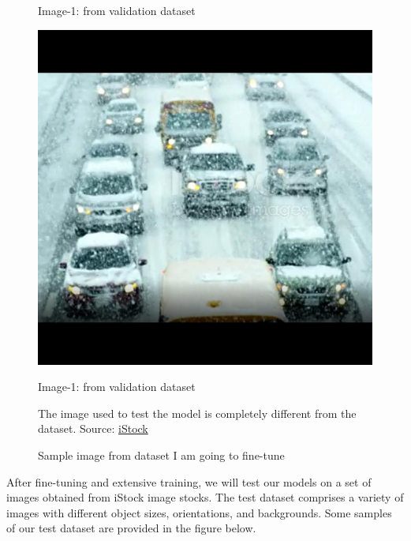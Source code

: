 \begin{figure}[H]
\begin{minipage}{0.5\textwidth}
    \caption{Image-1: from validation dataset}
    \label{fig:valid-1}
  \end{minipage}
    \begin{minipage}{0.5\textwidth}
    \centering
    \includegraphics[width=\linewidth]{tex/img/valid-2.jpg}
    \caption{Image-1: from validation dataset}
    \label{fig:valid-2}
  \end{minipage}
  \caption{Sample image from dataset I am going to fine-tune} 
\vspace{3mm}
  The image used to test the model is completely different from the dataset. Source: \href{https://www.istockphoto.com/pl/zdj%C4%99cie/wiele-samochod%C3%B3w-na-drodze-gm490081958-75026541}{iStock}
\end{figure}  
After fine-tuning and extensive training, we will test our models on a set of images obtained from iStock image stocks. The test dataset comprises a variety of images with different object sizes, orientations, and backgrounds. Some samples of our test dataset are provided in the figure below.

